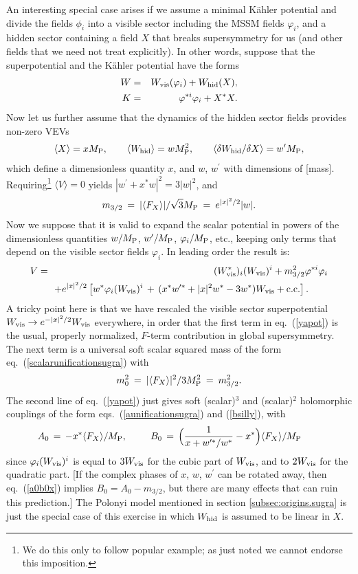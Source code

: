 \documentclass[12pt]{article}
\def\beq{\begin{eqnarray}}
\def\eeq{\end{eqnarray}}
\def\conj{{{\rm c.c.}}}
\def\MPlanck{M_{\rm P}}
\begin{document}
An interesting special case arises if we assume a minimal K\"ahler
potential and divide the fields $\phi_i$ into a visible sector including
the MSSM fields $\varphi_i$, and a hidden sector containing a field $X$
that breaks supersymmetry for us (and other fields that we need not treat
explicitly). In other words, suppose that the superpotential and the
K\"ahler potential 
have the forms
\beq
W &=& W_{\rm vis}(\varphi_i) + W_{\rm hid}(X),
\label{minw}\\
K &=& \varphi^{*i} \varphi_i + X^* X .
\label{mink}
\eeq
Now let us further assume that the dynamics of the hidden sector fields
provides non-zero VEVs
\beq
\langle X \rangle = x \MPlanck,\qquad
\langle W_{\rm hid}\rangle = w \MPlanck^2,\qquad
\langle \delta W_{\rm hid}/\delta X \rangle = w^\prime \MPlanck ,
\eeq
which define a dimensionless quantity $x$, and $w$, $w^\prime$ with 
dimensions of [mass]. Requiring\footnote{We do this only 
to follow popular example; as just 
noted we cannot endorse this imposition.} $\langle V \rangle = 0$ yields $|w^\prime 
+ x^* w|^2 = 3 |w|^2$, and
\beq
m_{3/2} \>=\> {|\langle F_X \rangle |/\sqrt{3} \MPlanck} \>=\> e^{|x|^2/2}|w|.
\eeq
Now we suppose that it is valid to expand the scalar potential in powers
of the dimensionless quantities $w/\MPlanck$, $w^\prime/\MPlanck$,
$\varphi_i/\MPlanck$, etc., keeping only terms that depend on the visible
sector fields $\varphi_i$. In
leading order the result is: 
\beq
V &=& (W^*_{\rm vis})_i (W_{\rm vis})^i + m_{3/2}^2
\varphi^{*i}\varphi_{i}
\nonumber \\ && \!\!
+ e^{|x|^2/2} \left [w^* \varphi_i (W_{\rm vis})^i\, +\,
(x^* w^{\prime *} + |x|^2 w^* - 3 w^*) W_{\rm vis} + \conj \right
].\qquad{}
\label{yapot}
\eeq
A tricky point here is that we have rescaled the visible sector
superpotential $W_{\rm vis} \rightarrow e^{-|x|^2/2} W_{\rm vis}$
everywhere, in order that the first term in eq.~(\ref{yapot}) is the
usual, properly normalized, $F$-term contribution in global supersymmetry.
The next term is a universal soft scalar squared mass of the form
eq.~(\ref{scalarunificationsugra}) with
\beq
m_0^2 \>=\> {|\langle F_X \rangle|^2/ 3 \MPlanck^2}
\>=\> m_{3/2}^2 .
\eeq
The second line of eq.~(\ref{yapot}) just gives soft (scalar)$^3$ and 
(scalar)$^2$ holomorphic couplings of the form
eqs.~(\ref{aunificationsugra}) and (\ref{bsilly}), with
\beq
A_0 \,=\, - x^* {\langle F_X \rangle / \MPlanck},
\qquad\>\>
B_0 \,=\, \Bigl (
{1\over x + w^{\prime *}/w^*} -x^*\Bigr ){\langle F_X \rangle / \MPlanck}
\qquad{}
\label{a0b0x}
\eeq
since $\varphi_i (W_{\rm vis})^i$ is equal to $3 W_{\rm vis}$ for the
cubic part of $W_{\rm vis}$, and to $2 W_{\rm vis}$ for the quadratic
part. [If the complex phases of $x$, $w$, $w^\prime$ can be rotated away,
then eq.~(\ref{a0b0x}) implies $B_0 = A_0 - m_{3/2}$, but there are many
effects that can ruin this prediction.] The Polonyi model mentioned in
section \ref{subsec:origins.sugra} is just the special case of this
exercise in which $W_{\rm hid}$ is assumed to be linear in $X$. 
\end{document}
